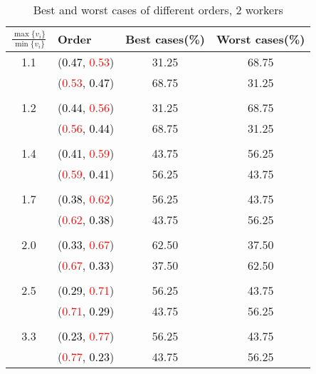 \documentclass[10pt,a4paper]{report}
\begin{document}
    \begin{center}
	\small
	\begin{longtable}{clcc}
		\caption{Best and worst cases of different orders, 2 workers}\\
		\toprule
		\setlength{\tabcolsep}{1mm}
		\renewcommand\baselinestretch{0.5}\selectfont
		$\frac{\max\{v_i\}}{\min\{v_i\}}$ & Order & Best cases(\%) & Worst cases(\%) \\
			\midrule		1.1			&(\textcolor{black}{0.47}, \textcolor{red}{0.53})&31.25&68.75\\
			&(\textcolor{red}{0.53}, \textcolor{black}{0.47})&68.75&31.25\\
		&&&\\
		1.2			&(\textcolor{black}{0.44}, \textcolor{red}{0.56})&31.25&68.75\\
			&(\textcolor{red}{0.56}, \textcolor{black}{0.44})&68.75&31.25\\
		&&&\\
		1.4			&(\textcolor{black}{0.41}, \textcolor{red}{0.59})&43.75&56.25\\
			&(\textcolor{red}{0.59}, \textcolor{black}{0.41})&56.25&43.75\\
		&&&\\
		1.7			&(\textcolor{black}{0.38}, \textcolor{red}{0.62})&56.25&43.75\\
			&(\textcolor{red}{0.62}, \textcolor{black}{0.38})&43.75&56.25\\
		&&&\\
		2.0			&(\textcolor{black}{0.33}, \textcolor{red}{0.67})&62.50&37.50\\
			&(\textcolor{red}{0.67}, \textcolor{black}{0.33})&37.50&62.50\\
		&&&\\
		2.5			&(\textcolor{black}{0.29}, \textcolor{red}{0.71})&56.25&43.75\\
			&(\textcolor{red}{0.71}, \textcolor{black}{0.29})&43.75&56.25\\
		&&&\\
		3.3			&(\textcolor{black}{0.23}, \textcolor{red}{0.77})&56.25&43.75\\
			&(\textcolor{red}{0.77}, \textcolor{black}{0.23})&43.75&56.25\\
		\bottomrule
	\end{longtable}
\end{center}
\end{document}
